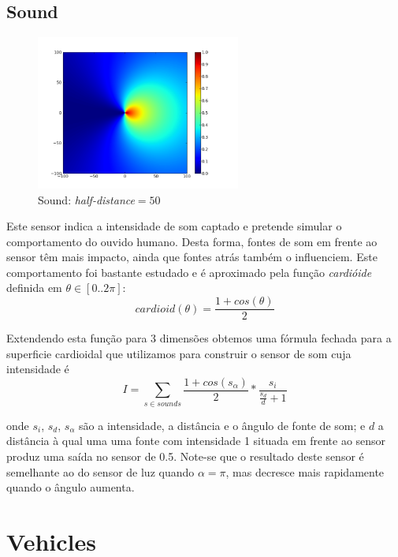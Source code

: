 \documentclass[a4paper]{article}
\begin{document}
\subsection{Sound}
\begin{figure}[h]
	\vspace{-20pt}
	\begin{center}
		\includegraphics[width=0.6\textwidth]{graphs/sensors/cardioid.png}
	\end{center}
	\vspace{-20pt}
	\caption{Sound: \emph{half-distance}$=50$}
\end{figure}

\indent Este sensor indica a intensidade de som captado e pretende simular o
comportamento do ouvido humano. Desta forma, fontes de som em frente ao sensor têm mais impacto,
ainda que fontes atrás também o influenciem. Este comportamento foi bastante estudado e é aproximado pela função \emph{cardióide} definida em $\theta \in [0..2\pi]$:
\[
	cardioid(\theta) = \frac{1 + cos(\theta)}{2}
\]

\indent Extendendo esta função para 3 dimensões obtemos uma fórmula fechada para a superficie cardioidal
que utilizamos para construir o sensor de som cuja intensidade é
\[
	I = \displaystyle\sum\limits_{s \in sounds}\frac{1+cos(s_{\alpha})}{2}*\frac{s_{i}}{\frac{s_{d}}{d}+1}
\] 

onde $s_{i}$, $s_{d}$, $s_{\alpha}$ são a intensidade, a distância e o ângulo de fonte de som;
e $d$ a distância à qual uma uma fonte com intensidade 1 situada em frente ao sensor produz uma saída no sensor de 0.5.
Note-se que o resultado deste sensor é semelhante ao do sensor de luz quando $\alpha=\pi$,
mas decresce mais rapidamente quando o ângulo aumenta.

\cleardoublepage
\section{Vehicles}
\end{document}
